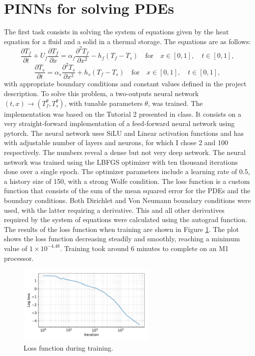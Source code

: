 \documentclass[unicode,11pt,a4paper,oneside,numbers=endperiod,openany]{scrartcl}
\begin{document}
\section{PINNs for solving PDEs}\label{sec:task1}
The first task consists in solving the system of equations given by the heat
equation for a fluid and a solid in a thermal storage. The equations are as follows:
\begin{equation}
    \frac{\partial T_f}{\partial t} + U_f \frac{\partial T_f}{\partial x} = \alpha_f \frac{\partial^2 T_f}{\partial x^2} - h_f(T_f - T_s) \quad \text{for} \quad x \in [0, 1], \quad t \in [0, 1],
\end{equation}
\begin{equation}
     \frac{\partial T_s}{\partial t} = \alpha_s \frac{\partial^2 T_s}{\partial x^2} + h_s(T_f - T_s) \quad \text{for} \quad x \in [0, 1], \quad t \in [0, 1],
\end{equation}
with appropriate boundary conditions and constant values defined in the project description.
To solve this problem, a two-outputs neural network $(t,x) \to
(T^{\theta}_f,T^{\theta}_s)$, with tunable parameters $\theta$, was trained.
The implementation was based on the Tutorial 2 presented in class. It consists on a
very straight-forward implementation of a feed-forward neural network using
pytorch. 
The neural network uses SiLU and Linear activation functions and has with adjustable
number of layers and neurons, for which I chose 2 and 100 respectively. The numbers
reveal a dense but not very deep network.
The neural network was trained using the LBFGS optimizer with ten thousand
iterations done over a single epoch. The optimizer parameters include a learning rate 
of 0.5, a history size of 150, with a strong Wolfe condition. The loss
function is a custom function that consists of the sum of the mean squared
error for the PDEs and the boundary conditions. 
Both Dirichlet and Von Neumann boundary conditions were used, with the latter
requiring a derivative. This and all other derivatives required by the system of
equations were calculated using the autograd function.
The results of the loss function when training are shown in Figure
\ref{fig:task1_loss}. The plot shows the loss function decreasing steadily and
smoothly, reaching a minimum value of $1\times 10^{-4.48}$. Training took around 6
minutes to complete on an M1 processor.
\begin{figure}[h]
    \centering
    \includegraphics[width=0.6\textwidth]{../Proj1_Y24/Task1/loss.pdf}
    \caption{Loss function during training.}
    \label{fig:task1_loss}
\end{figure}
\end{document}
